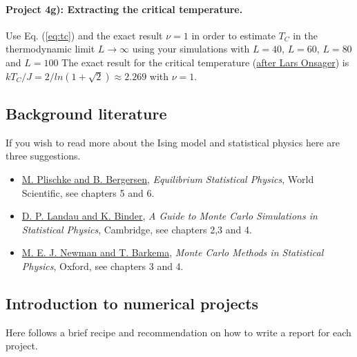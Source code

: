 \documentclass[%
oneside,                 %
final,                   %
10pt]{article}
\begin{document}
\paragraph{Project 4g): Extracting the critical temperature.}
Use Eq. (\ref{eq:tc}) and the exact result
$\nu=1$ in order to estimate $T_C$ in the thermodynamic limit 
$L\rightarrow \infty$
using your simulations with $L=40$, $L=60$, $L=80$ and $L=100$
The exact result for the critical temperature (\href{{http://journals.aps.org/pr/abstract/10.1103/PhysRev.65.117}}{after Lars Onsager}) is
$kT_C/J=2/ln(1+\sqrt{2})\approx 2.269$ with $\nu=1$.

\subsection{Background literature}

If you wish to read more about the Ising model and statistical physics here are three suggestions.

\begin{itemize}
  \item \href{{http://www.worldscientific.com/worldscibooks/10.1142/5660}}{M. Plischke and B. Bergersen}, \emph{Equilibrium Statistical Physics}, World Scientific, see chapters 5 and 6.

  \item \href{{http://www.cambridge.org/no/academic/subjects/physics/computational-science-and-modelling/guide-monte-carlo-simulations-statistical-physics-4th-edition?format=HB}}{D. P. Landau and K. Binder}, \emph{A Guide to Monte Carlo Simulations in Statistical Physics}, Cambridge, see chapters 2,3 and 4.

  \item \href{{https://global.oup.com/academic/product/monte-carlo-methods-in-statistical-physics-9780198517979?cc=no&lang=en&}}{M. E. J. Newman and T. Barkema}, \emph{Monte Carlo Methods in Statistical Physics}, Oxford, see chapters 3 and 4.
\end{itemize}

\noindent
\subsection{Introduction to numerical projects}

Here follows a brief recipe and recommendation on how to write a report for each
project.
\end{document}
